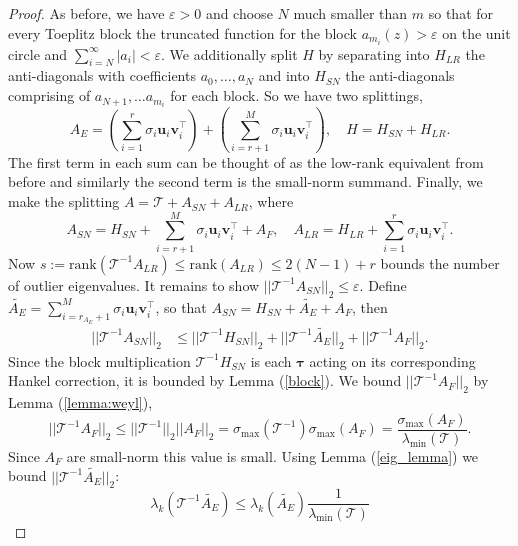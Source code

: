 \documentclass[review]{siamart251216}
\renewcommand{\vec}[1]{{{\mathbf{#1}}}}
\renewcommand{\u}{{\vec  u }}
\renewcommand{\v}{{\vec  v }}
\newcommand{\A}{{A }}
\newcommand{\offd}{{A_E}}
\newcommand{\Hank}{{ H }}
\newcommand{\Tau}{\mathcal{T}}
\newcommand{\ptau}{{\bm{\tau}}}
\begin{document}
\begin{proof}
As before, we have $\varepsilon > 0$ and choose $N$ much smaller than $m$ so that for every Toeplitz block the truncated function for the block $a_{m_i} (z) > \varepsilon$ on the unit circle and $\sum_{i = N}^{\infty} |a_i| < \varepsilon$. 
We additionally split $\Hank$ by separating into $\Hank_{LR}$ the anti-diagonals with coefficients $a_0, \dots, a_N$ and into $\Hank_{SN}$ the anti-diagonals comprising of $a_{N+1}, \dots a_{m_i}$ for each block. So we have two splittings, 
\begin{equation*} 
	\offd = \left( \sum_{i=1}^{r} \sigma_i \u_i \v_i^{\top} \right) + \left(  \sum_{i=r+1}^{M} \sigma_i \u_i \v_i^{\top}  \right), \quad
	\Hank = \Hank_{SN} + \Hank_{LR}.
\end{equation*}
The first term in each sum can be thought of as the low-rank equivalent from before and similarly the second term is the small-norm summand.
Finally, we make the splitting $\A = \Tau + \A_{SN} + \A_{LR}$, where
\begin{equation*}
	\A_{SN} = \Hank_{SN}+ \sum_{i=r+1}^{M} \sigma_i \u_i \v_i^{\top} +A_F, \quad
	\A_{LR} = \Hank_{LR} + \sum_{i=1}^{r} \sigma_i \u_i \v_i^{\top}.
\end{equation*}
Now $s := \text{rank}(\Tau^{-1}\A_{LR}) \leq \text{rank}(\A_{LR}) \leq 2(N-1) + r$ bounds the number of outlier eigenvalues. It remains to show $|| \Tau^{-1}\A_{SN}||_2 \leq \varepsilon$. Define $\tilde{\offd} = \sum_{i=r_{\offd}+1}^{M} \sigma_i \u_i \v_i^{\top} $, so that $\A_{SN} = \Hank_{SN} + \tilde{\offd} + \A_F$, then
\begin{align*}
	|| \Tau^{-1}\A_{SN}||_2 &\leq ||\Tau^{-1} \Hank_{SN}||_2 + ||\Tau^{-1} \tilde{\offd}||_2 +||\Tau^{-1} \A_F ||_2.
\end{align*}
Since the block multiplication $\Tau^{-1} \Hank_{SN}$ is each $\ptau$ acting on its corresponding Hankel correction, it is bounded by Lemma (\ref{block}). 
We bound $||\Tau^{-1} \A_F||_2$ by Lemma (\ref{lemma:weyl}),
\begin{equation*}
	||\Tau^{-1} \A_F||_2 \leq ||\Tau^{-1}||_2 ||\A_F||_2 =\sigma_{\max}(\Tau^{-1}) \sigma_{\max}(\A_F) = \frac{ \sigma_{\max}(\A_F)}{\lambda_{\min}(\Tau)}.
\end{equation*}
Since $\A_F$ are small-norm this value is small. 
Using Lemma (\ref{eig_lemma}) we bound $||\Tau^{-1} \tilde{\offd}||_2$:
\begin{equation} \label{eq:gen_bound_ad}
	\lambda_k ( \Tau^{-1} \tilde{\offd}) \leq \lambda_k(\tilde{\offd})  \frac{1}{\lambda_{\min}(\Tau)} 

\end{equation}
\end{proof}
\end{document}
